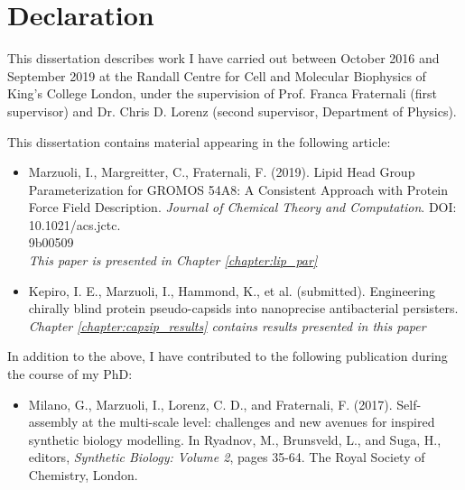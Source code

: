 \chapter*{Declaration}
\begin{onehalfspacing}

\noindent This dissertation describes work I have carried out between October 2016 and September 2019 at the Randall Centre for Cell and Molecular Biophysics of King's College London, under the supervision of Prof. Franca Fraternali (first supervisor) and Dr. Chris D. Lorenz (second supervisor, Department of Physics).

\vspace{.2cm}

\noindent This dissertation contains material appearing in the following article:

\begin{itemize}
\item Marzuoli, I., Margreitter, C., Fraternali, F. (2019). Lipid Head Group Parameterization for GROMOS 54A8: A Consistent Approach with Protein Force Field Description. \emph{Journal of Chemical Theory and Computation}. DOI: 10.1021/acs.jctc. \\9b00509  \\
\emph{This paper is presented in Chapter \ref{chapter:lip_par}}
\item Kepiro, I. E., Marzuoli, I., Hammond, K., et al. (submitted). Engineering chirally blind protein pseudo-capsids into nanoprecise antibacterial persisters. \\
\emph{Chapter \ref{chapter:capzip_results} contains results presented in this paper}
\end{itemize}

\noindent In addition to the above, I have contributed to the following publication during the course of my PhD:

\begin{itemize}
%
\item Milano, G., Marzuoli, I., Lorenz, C. D., and Fraternali, F. (2017). Self-assembly at the multi-scale level: challenges and new avenues for inspired synthetic biology modelling. In Ryadnov, M., Brunsveld, L., and Suga, H., editors, \emph{Synthetic Biology: Volume 2}, pages 35-64. The Royal Society of Chemistry, London.
%
\end{itemize}



\end{onehalfspacing}
